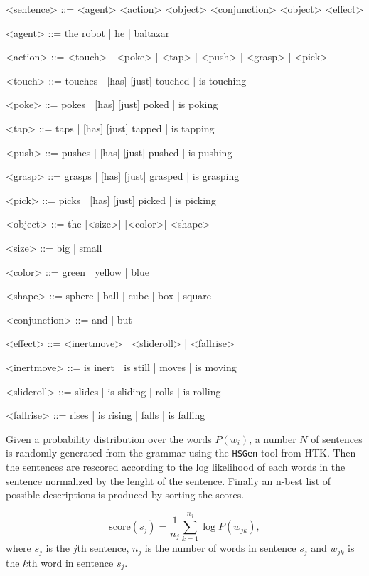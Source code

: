 \begin{grammar}
  <sentence> ::= <agent> <action> <object> <conjunction> <object> <effect>

  <agent> ::= the robot | he | baltazar 

  <action> ::= <touch> | <poke> | <tap> | <push> | <grasp> | <pick>

  <touch> ::= touches | [has] [just] touched | is touching
  
  <poke> ::= pokes | [has] [just] poked | is poking
  
  <tap> ::= taps | [has] [just] tapped | is tapping
  
  <push> ::= pushes | [has] [just] pushed | is pushing
  
  <grasp> ::= grasps | [has] [just] grasped | is grasping
  
  <pick> ::= picks | [has] [just] picked | is picking

  <object> ::= the [<size>] [<color>] <shape>

  <size> ::= big | small
  
  <color> ::= green | yellow | blue
  
  <shape> ::= sphere | ball | cube | box | square

  <conjunction> ::= and | but

  <effect> ::= <inertmove> | <slideroll> | <fallrise>

  <inertmove> ::= is inert | is still | moves | is moving
  
  <slideroll> ::= slides | is sliding | rolls | is rolling
  
  <fallrise> ::= rises | is rising | falls | is falling
\end{grammar}

Given a probability distribution over the words $P(w_i)$, a number $N$ of sentences is randomly generated from the grammar using the \texttt{HSGen} tool from HTK.
Then the sentences are rescored according to the log likelihood of each words in the sentence normalized by the lenght of the sentence.
Finally an n-best list of possible descriptions is produced by sorting the scores.

\begin{equation*}
  \text{score}(s_j) = \frac{1}{n_j} \sum_{k=1}^{n_j} \log P(w_{jk}),
\end{equation*}
where $s_j$ is the $j$th sentence, $n_j$ is the number of words in sentence $s_j$ and $w_{jk}$ is the $k$th word in sentence $s_j$.

